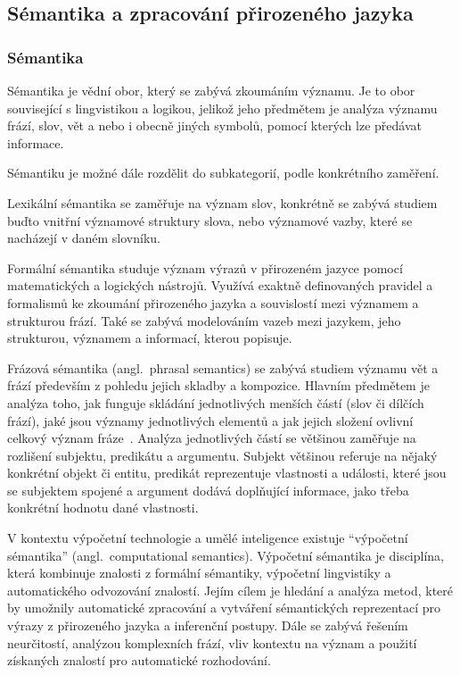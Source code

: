 \subsection{Sémantika a zpracování přirozeného jazyka}
\subsubsection{Sémantika}
Sémantika je vědní obor, který se zabývá zkoumáním významu.
Je to obor související s lingvistikou a logikou, jelikož jeho předmětem je analýza významu frází, slov, vět a nebo i obecně jiných symbolů,
pomocí kterých lze předávat informace.~\cite{palmer1981semantics}

Sémantiku je možné dále rozdělit do subkategorií, podle konkrétního zaměření.

Lexikální sémantika se zaměřuje na význam slov, konkrétně se zabývá studiem buďto vnitřní významové struktury slova,
nebo významové vazby, které se nacházejí v daném slovníku.~\cite{lexical-semantics}

Formální sémantika studuje význam výrazů v přirozeném jazyce pomocí matematických a logických nástrojů.
Využívá exaktně definovaných pravidel a formalismů ke zkoumání přirozeného jazyka a souvislostí mezi významem a strukturou frází.
Také se zabývá modelováním vazeb mezi jazykem, jeho strukturou, významem a informací, kterou popisuje.~\cite{rajman2007speech}~\cite{portner2008formal}

Frázová sémantika (angl.~phrasal semantics) se zabývá studiem významu vět a frází především z pohledu jejich skladby a kompozice.
Hlavním předmětem je analýza toho, jak funguje skládání jednotlivých menších částí (slov či dílčích frází),
jaké jsou významy jednotlivých elementů a jak jejich složení ovlivní celkový význam fráze~\cite{riemer2010introducing-semantic}.
Analýza jednotlivých částí se většinou zaměřuje na rozlišení subjektu, predikátu a argumentu.
Subjekt většinou referuje na nějaký konkrétní objekt či entitu, predikát reprezentuje vlastnosti a události, které jsou se subjektem spojené
a argument dodává doplňující informace, jako třeba konkrétní hodnotu dané vlastnosti.~\cite{fasold2006introduction}

V kontextu výpočetní technologie a umělé inteligence existuje \enquote{výpočetní sémantika} (angl.~computational semantics).
Výpočetní sémantika je disciplína, která kombinuje znalosti z formální sémantiky, výpočetní lingvistiky a automatického odvozování znalostí.
Jejím cílem je hledání a analýza metod, které by umožnily automatické zpracování a vytváření
sémantických reprezentací pro výrazy z přirozeného jazyka a inferenční postupy.
Dále se zabývá řešením neurčitostí, analýzou komplexních frází,
vliv kontextu na význam a použití získaných znalostí pro automatické rozhodování.~\cite{computational-semantics-blackburn-bos}~\cite{computation-semantics}

